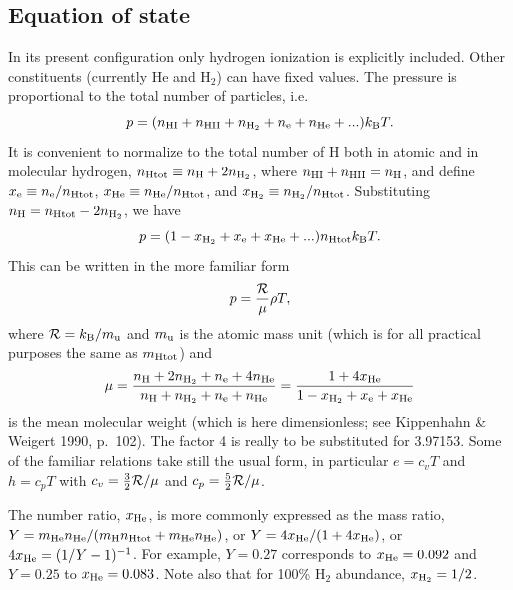 \documentclass[\mydriver,12pt,twoside,notitlepage,a4paper]{article}
\begin{document}

\subsection{Equation of state}
\label{S-eos}

In its present configuration only hydrogen ionization is explicitly included.
Other constituents (currently He and H$_2$) can have fixed values.
The pressure is proportional to the total number of particles, i.e.\
\begin{equation}
p=(n_{\rm HI}+n_{\rm HII}+n_{\rm H_2}+n_{\rm e}+n_{\rm He}+...)k_{\rm B}T.
\end{equation}
It is convenient to normalize to the total number of H both in atomic
and in molecular hydrogen, $n_{\rm Htot}\equiv n_{\rm H}+2n_{\rm H_2}$,
where $n_{\rm HI}+n_{\rm HII}=n_{\rm H}$, and define
$x_{\rm e}\equiv n_{\rm e}/n_{\rm Htot}$,
$x_{\rm He}\equiv n_{\rm He}/n_{\rm Htot}$, and
$x_{\rm H_2}\equiv n_{\rm H_2}/n_{\rm Htot}$.
Substituting $n_{\rm H}=n_{\rm Htot}-2n_{\rm H_2}$, we have
\begin{equation}
p=(1-x_{\rm H_2}+x_{\rm e}+x_{\rm He}+...)n_{\rm Htot}k_{\rm B}T.
\end{equation}
This can be written in the more familiar form
\begin{equation}
p={{\cal R}\over\mu}\rho T,
\end{equation}
where ${\cal R}=k_{\rm B}/m_{\rm u}$ and
$m_{\rm u}$ is the atomic mass unit (which is for all practical
purposes the same as $m_{\rm Htot}$) and
\begin{equation}
\mu={n_{\rm H}+2n_{\rm H_2}+n_{\rm e}+4n_{\rm He}\over
n_{\rm H}+n_{\rm H_2}+n_{\rm e}+n_{\rm He}}
={1+4x_{\rm He}\over1-x_{\rm H_2}+x_{\rm e}+x_{\rm He}}
\end{equation}
is the mean molecular weight (which is here dimensionless; see
Kippenhahn \& Weigert 1990, p.\ 102).
The factor 4 is really to be substituted for 3.97153.
Some of the familiar relations take still the usual form, in particular
$e=c_vT$ and $h=c_pT$ with $c_v={3\over2}{\cal R}/\mu$ and
$c_p={5\over2}{\cal R}/\mu$.

The number ratio, $x_{\rm He}$, is more commonly expressed as the mass
ratio, $Y=m_{\rm He}n_{\rm He}/(m_{\rm H}n_{\rm Htot}+m_{\rm He}n_{\rm He})$,
or $Y=4x_{\rm He}/(1+4x_{\rm He})$, or $4x_{\rm He}=(1/Y-1)^{-1}$.
For example, $Y=0.27$ corresponds to $x_{\rm He}=0.092$
and $Y=0.25$ to $x_{\rm He}=0.083$.
Note also that for 100\% H$_2$ abundance, $x_{\rm H_2}=1/2$.
\end{document}
